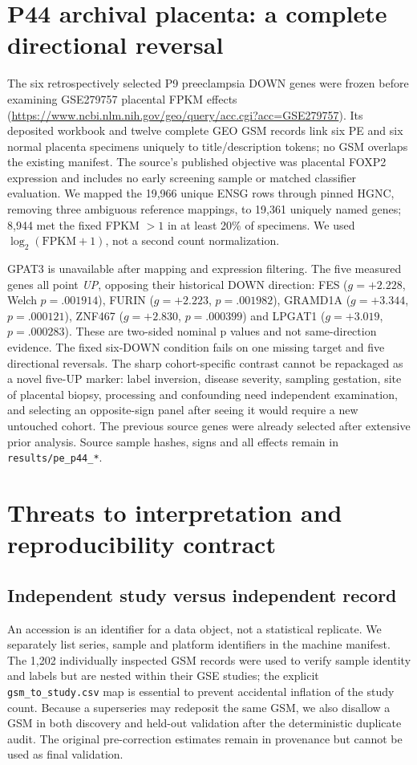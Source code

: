 \documentclass[11pt,a4paper]{article}
\begin{document}
\section{P44 archival placenta: a complete directional reversal}
The six retrospectively selected P9 preeclampsia DOWN genes were frozen before examining GSE279757 placental FPKM effects (\url{https://www.ncbi.nlm.nih.gov/geo/query/acc.cgi?acc=GSE279757}). Its deposited workbook and twelve complete GEO GSM records link six PE and six normal placenta specimens uniquely to title/description tokens; no GSM overlaps the existing manifest. The source's published objective was placental FOXP2 expression and includes no early screening sample or matched classifier evaluation. We mapped the 19,966 unique ENSG rows through pinned HGNC, removing three ambiguous reference mappings, to 19,361 uniquely named genes; 8,944 met the fixed FPKM $>1$ in at least 20\% of specimens. We used $\log_2(\mathrm{FPKM}+1)$, not a second count normalization.

GPAT3 is unavailable after mapping and expression filtering. The five measured genes all point \emph{UP}, opposing their historical DOWN direction: FES ($g=+2.228$, Welch $p=.001914$), FURIN ($g=+2.223$, $p=.001982$), GRAMD1A ($g=+3.344$, $p=.000121$), ZNF467 ($g=+2.830$, $p=.000399$) and LPGAT1 ($g=+3.019$, $p=.000283$). These are two-sided nominal p values and not same-direction evidence. The fixed six-DOWN condition fails on one missing target and five directional reversals. The sharp cohort-specific contrast cannot be repackaged as a novel five-UP marker: label inversion, disease severity, sampling gestation, site of placental biopsy, processing and confounding need independent examination, and selecting an opposite-sign panel after seeing it would require a new untouched cohort. The previous source genes were already selected after extensive prior analysis. Source sample hashes, signs and all effects remain in \texttt{results/pe\_p44\_*}.

\section{Threats to interpretation and reproducibility contract}
\subsection{Independent study versus independent record}
An accession is an identifier for a data object, not a statistical replicate. We separately list series, sample and platform identifiers in the machine manifest. The 1,202 individually inspected GSM records were used to verify sample identity and labels but are nested within their GSE studies; the explicit \texttt{gsm\_to\_study.csv} map is essential to prevent accidental inflation of the study count. Because a superseries may redeposit the same GSM, we also disallow a GSM in both discovery and held-out validation after the deterministic duplicate audit. The original pre-correction estimates remain in provenance but cannot be used as final validation.
\end{document}
